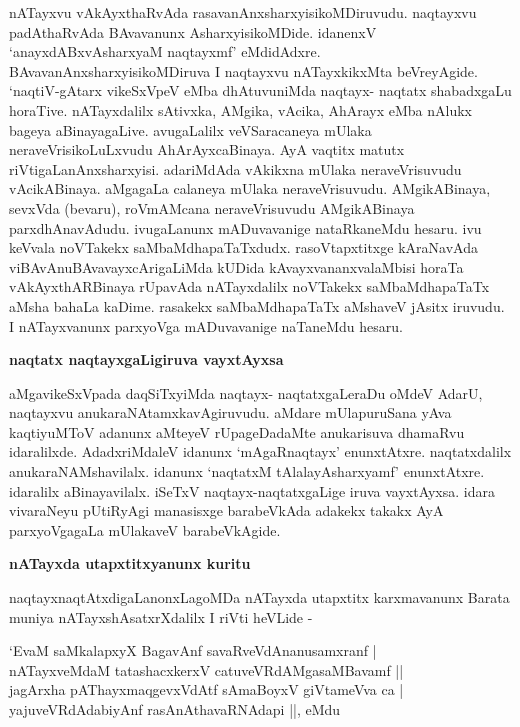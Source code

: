 nATayxvu vAkAyxthaRvAda rasavanAnxsharxyisikoMDiruvudu. naqtayxvu padAthaR\-vAda BAvavanunx Asharx\-yisikoMDide. idanenxV `anayxdABxvAsharxyaM naqtayxmf'\label{241} eMdidAdxre. BAvavanAnxsharxyisikoMDiruva I naq\-tayxvu nATayxkikxMta beVreyAgide. `naqtiV-gAtarx vikeSxVpeV eMba dhAtuvuniMda naqtayx- naqtatx shabadxgaLu hora\-Tive. nATayxdalilx sAtivxka, AMgika, vAcika, AhArayx eMba nAlukx bageya aBinayagaLive. avugaLalilx veVSaracaneya mUlaka neraveVrisikoLuLxvudu AhArAyxcaBinaya. AyA vaqtitx matutx riVtigaLanAnxsharx\-yisi. adariMdAda vAkikxna mUlaka neraveVrisuvudu vAcikABinaya. aMgagaLa calaneya mUlaka neraveVrisuvudu. AMgikABinaya, sevxVda (bevaru), roVmAMcana neraveVrisuvudu AMgikABinaya parxdhAnavAdudu. ivugaLanunx mADuvavanige nataRkaneMdu hesaru. ivu keVvala noVTakekx saMbaMdha\-paTaTxdudx. rasoVtapxtitxge kAraNavAda viBAvAnuBAvavayxcArigaLiMda kUDida kAvayxvananxvalaMbisi horaTa vAkAyxthARBinaya rUpavAda nATayxdalilx noVTakekx saMbaMdhapaTaTx aMsha bahaLa kaDime. rasakekx saMbaMdha\-paTaTx aMshaveV jAsitx iruvudu. I nATayxvanunx parxyoVga mADuvavanige naTaneMdu hesaru.

{\bigskip
\noindent
{\large\bf naqtatx naqtayxgaLigiruva vayxtAyxsa}}
\medskip

\noindent
aMgavikeSxVpada daqSiTxyiMda naqtayx- naqtatxgaLeraDu oMdeV AdarU, naqtayxvu anukaraNAtamxkavAgiru\-vudu. aMdare mUlapuruSana yAva kaqtiyuMToV adanunx aMteyeV rUpageDadaMte anukarisuva dhamaR\-vu idaralilxde. AdadxriMdaleV idanunx `mAgaRnaqtayx' enunxtAtxre. naqtatxdalilx anukaraNAMshavilalx. idanunx `naqtatxM tAlalayAsharxyamf' enunxtAtxre. idaralilx aBinayavilalx. iSeTxV naqtayx-naqtatxgaLige iruva vayxtAyxsa. idara vivaraNeyu pUtiRyAgi manasisxge barabeVkAda adakekx takakx AyA parxyoVgagaLa mUlakaveV barabeVkAgide.

{\bigskip
\noindent
{\large\bf nATayxda utapxtitxyanunx kuritu}}\label{page242}
\medskip

\noindent
naqtayxnaqtAtxdigaLanonxLagoMDa nATayxda utapxtitx karxmavanunx Barata muniya nATayxshAsatxrXdalilx I riVti heVLide -

\begin{shloka}
`EvaM saMkalapxyX BagavAnf savaRveVdAnanusamxranf |\\\label{242}
nATayxveMdaM tatashacxkerxV catuveVRdAMgasaMBavamf ||\\
jagArxha pAThayxmaqgevxVdAtf sAmaBoyxV giVtameVva ca |\\
yajuveVRdAdabiyAnf rasAnAthavaRNAdapi ||, eMdu
\end{shloka}

